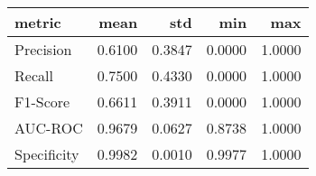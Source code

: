 \begin{tabular}{lrrrr}
\toprule
metric & mean & std & min & max \\
\midrule
Precision & 0.6100 & 0.3847 & 0.0000 & 1.0000 \\
Recall & 0.7500 & 0.4330 & 0.0000 & 1.0000 \\
F1-Score & 0.6611 & 0.3911 & 0.0000 & 1.0000 \\
AUC-ROC & 0.9679 & 0.0627 & 0.8738 & 1.0000 \\
Specificity & 0.9982 & 0.0010 & 0.9977 & 1.0000 \\
\bottomrule
\end{tabular}
